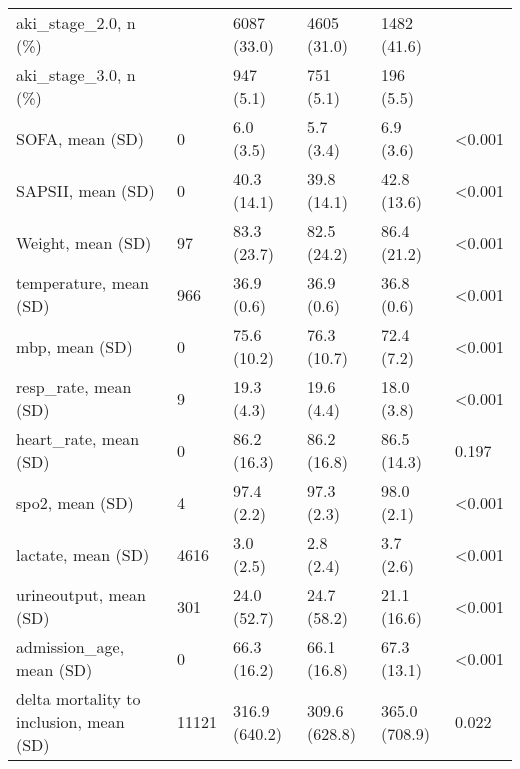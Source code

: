 \documentclass[10pt,letterpaper]{article}
\begin{document}
\begin{table}[h!]
{\begin{tabular}{llllll}
            aki\_stage\_2.0, n (\%)                           &         & 6087 (33.0)   & 4605 (31.0)       & 1482 (41.6)            &         \\
            aki\_stage\_3.0, n (\%)                           &         & 947 (5.1)     & 751 (5.1)         & 196 (5.5)              &         \\
            SOFA, mean (SD)                                   & 0       & 6.0 (3.5)     & 5.7 (3.4)         & 6.9 (3.6)              & <0.001  \\
            SAPSII, mean (SD)                                 & 0       & 40.3 (14.1)   & 39.8 (14.1)       & 42.8 (13.6)            & <0.001  \\
            Weight, mean (SD)                                 & 97      & 83.3 (23.7)   & 82.5 (24.2)       & 86.4 (21.2)            & <0.001  \\
            temperature, mean (SD)                            & 966     & 36.9 (0.6)    & 36.9 (0.6)        & 36.8 (0.6)             & <0.001  \\
            mbp, mean (SD)                                    & 0       & 75.6 (10.2)   & 76.3 (10.7)       & 72.4 (7.2)             & <0.001  \\
            resp\_rate, mean (SD)                             & 9       & 19.3 (4.3)    & 19.6 (4.4)        & 18.0 (3.8)             & <0.001  \\
            heart\_rate, mean (SD)                            & 0       & 86.2 (16.3)   & 86.2 (16.8)       & 86.5 (14.3)            & 0.197   \\
            spo2, mean (SD)                                   & 4       & 97.4 (2.2)    & 97.3 (2.3)        & 98.0 (2.1)             & <0.001  \\
            lactate, mean (SD)                                & 4616    & 3.0 (2.5)     & 2.8 (2.4)         & 3.7 (2.6)              & <0.001  \\
            urineoutput, mean (SD)                            & 301     & 24.0 (52.7)   & 24.7 (58.2)       & 21.1 (16.6)            & <0.001  \\
            admission\_age, mean (SD)                         & 0       & 66.3 (16.2)   & 66.1 (16.8)       & 67.3 (13.1)            & <0.001  \\
            delta mortality to inclusion, mean (SD)           & 11121   & 316.9 (640.2) & 309.6 (628.8)     & 365.0 (708.9)          & 0.022   \\

\end{tabular}}
\end{table}
\end{document}
